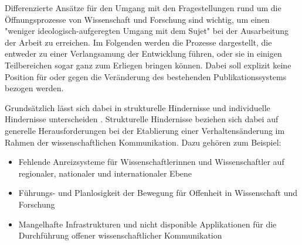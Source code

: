 Differenzierte Ansätze für den Umgang mit den Fragestellungen rund um die Öffnungsprozesse von Wissenschaft und Forschung sind wichtig, um einen "weniger ideologisch-aufgeregten Umgang mit dem Sujet" \cite[:13]{naeder_2010_open} bei der Ausarbeitung der Arbeit zu erreichen. Im Folgenden werden die Prozesse dargestellt, die entweder zu einer Verlangsamung der Entwicklung führen, oder sie in einigen Teilbereichen sogar ganz zum Erliegen bringen können. Dabei soll explizit keine Position für oder gegen die Veränderung des bestehenden Publikationssystems bezogen werden.

Grundsätzlich lässt sich dabei in strukturelle Hindernisse und individuelle Hindernisse unterscheiden \cite{Scheliga_2014}. Strukturelle Hindernisse beziehen sich dabei auf generelle Herausforderungen bei der Etablierung einer Verhaltensänderung im Rahmen der wissenschaftlichen Kommunikation. Dazu gehören zum Beispiel:
\begin{itemize}
\item Fehlende Anreizsysteme für Wissenschaftlerinnen und Wissenschaftler auf regionaler, nationaler und internationaler Ebene
\item Führungs- und Planlosigkeit der Bewegung für Offenheit in Wissenschaft und Forschung
\item Mangelhafte Infrastrukturen und nicht disponible Applikationen für die Durchführung offener wissenschaftlicher Kommunikation
\end{itemize}

